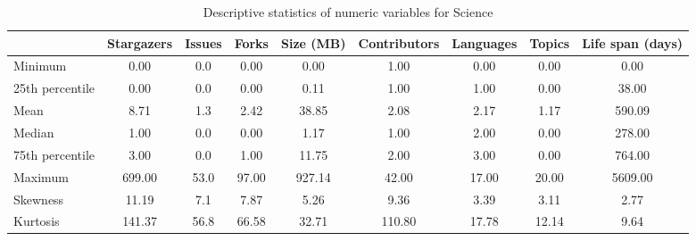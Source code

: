 \begin{table}
\centering
\caption{Descriptive statistics of numeric variables for Science}
\label{tab:Science}
\begin{tabular}{lcccccccc}
\toprule
{} &  Stargazers &  Issues &  Forks &  Size (MB) &  Contributors &  Languages &  Topics &  Life span (days) \\
\midrule
Minimum         &        0.00 &     0.0 &   0.00 &       0.00 &          1.00 &       0.00 &    0.00 &              0.00 \\
25th percentile &        0.00 &     0.0 &   0.00 &       0.11 &          1.00 &       1.00 &    0.00 &             38.00 \\
Mean            &        8.71 &     1.3 &   2.42 &      38.85 &          2.08 &       2.17 &    1.17 &            590.09 \\
Median          &        1.00 &     0.0 &   0.00 &       1.17 &          1.00 &       2.00 &    0.00 &            278.00 \\
75th percentile &        3.00 &     0.0 &   1.00 &      11.75 &          2.00 &       3.00 &    0.00 &            764.00 \\
Maximum         &      699.00 &    53.0 &  97.00 &     927.14 &         42.00 &      17.00 &   20.00 &           5609.00 \\
Skewness        &       11.19 &     7.1 &   7.87 &       5.26 &          9.36 &       3.39 &    3.11 &              2.77 \\
Kurtosis        &      141.37 &    56.8 &  66.58 &      32.71 &        110.80 &      17.78 &   12.14 &              9.64 \\
\bottomrule
\end{tabular}
\end{table}
